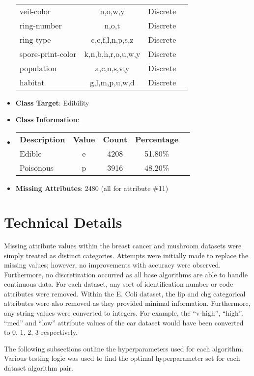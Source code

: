 \documentclass[11pt]{article}
\newcommand{\bb}{\textbf}
\begin{document}
\begin{itemize}[leftmargin=*]
\begin{tabular}{l c c c }
    veil-color               & n,o,w,y                 & Discrete  \\
    ring-number              & n,o,t                   & Discrete  \\
    ring-type                & c,e,f,l,n,p,s,z         & Discrete  \\
    spore-print-color        & k,n,b,h,r,o,u,w,y       & Discrete  \\
    population               & a,c,n,s,v,y             & Discrete  \\
    habitat                  & g,l,m,p,u,w,d           & Discrete
  \end{tabular}
  \item[] \bb{Class Target}: Edibility
  \item[] \bb{Class Information}:
  \item[]
  \begin{tabular}{l c c c c }
    \bb{Description} & \bb{Value} & \bb{Count} & \bb{Percentage} \\
    Edible           & e          & 4208       & 51.80\%        \\
    Poisonous        & p          & 3916       & 48.20\%
  \end{tabular}
  \item[] \bb{Missing Attributes}: 2480 (all for attribute \#11)
\end{itemize}

\section{Technical Details} \label{sec:details}
Missing attribute values within the breast cancer and mushroom datasets were simply treated as distinct categories. Attempts were initially made to replace the missing values; however, no improvements with accuracy were observed. Furthermore, no discretization occurred as all base algorithms are able to handle continuous data. For each dataset, any sort of identification number or code attributes were removed. Within the E. Coli dataset, the lip and chg categorical attributes were also removed as they provided minimal information. Furthermore, any string values were converted to integers. For example, the ``v-high'', ``high'', ``med'' and ``low'' attribute values of the car dataset would have been converted to 0, 1, 2, 3 respectively.

The following subsections outline the hyperparameters used for each algorithm. Various testing logic was used to find the optimal hyperparameter set for each dataset algorithm pair.
\end{document}
